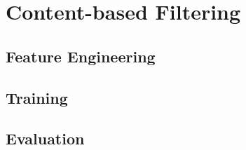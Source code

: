 \section{Content-based Filtering}
\subsection{Feature Engineering}
\subsection{Training}
\subsection{Evaluation}